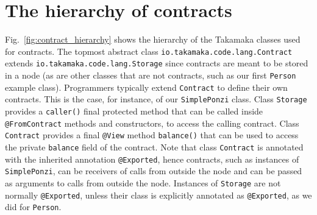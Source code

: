 \section{The hierarchy of contracts}\label{sec:hierarchy_of_contracts}

Fig.~\ref{fig:contract_hierarchy} shows the hierarchy of the Takamaka classes used for contracts.
The topmost abstract class \texttt{io.takamaka.code.lang.Contract}
extends \texttt{io.takamaka.code.lang.Storage} since contracts are meant to be
stored in a node (as are other classes that are not contracts,
such as our first \texttt{Person} example class).
Programmers typically extend \texttt{Contract} to define their own contracts.
This is the case, for instance, of our \texttt{SimplePonzi} class.
Class \texttt{Storage} provides a \texttt{caller()}
final protected method that can be called inside
\texttt{@FromContract} methods and constructors, to access the calling contract.
Class \texttt{Contract} provides a final \texttt{@View} method \texttt{balance()}
that can be used to access the private \texttt{balance} field of the contract.
Note that class \texttt{Contract} is annotated with the inherited
annotation \texttt{@Exported},
hence contracts, such as instances of \texttt{SimplePonzi}, can be receivers of calls
from outside the node and can be passed as arguments to calls from outside the node.
Instances of \texttt{Storage} are not normally \texttt{@Exported}, unless their class
is explicitly annotated as \texttt{@Exported}, as we did for \texttt{Person}.
%
